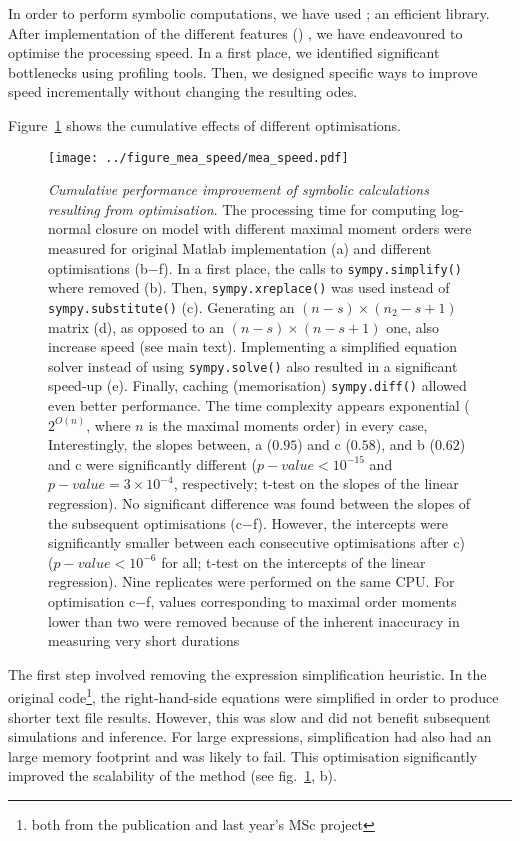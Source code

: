 In order to perform symbolic computations, we have used \sympy{} \cite{sympy_development_team_sympy:_2014}; an efficient \py{} library.
After implementation of the different features ()
, we have endeavoured to optimise the processing speed.
In a first place, we identified significant bottlenecks using \py{} profiling tools.
Then, we designed specific ways to improve speed incrementally without changing the resulting \gls{ode}s.

Figure~\ref{fig:mea_speed} shows the cumulative effects of different optimisations.


\begin{figure}

\texttt{[image: ../figure\_mea\_speed/mea\_speed.pdf]}
\caption{\emph{Cumulative performance improvement of symbolic calculations resulting from optimisation}.
The processing time for computing log-normal closure on \pft{} model with different maximal moment orders were measured for original Matlab implementation (a) and different optimisations (b$-$f).
In a first place, the calls to \texttt{sympy.simplify()} where removed (b). 
Then, \texttt{sympy.xreplace()} was used instead of \texttt{sympy.substitute()} (c). 
Generating an $(n-s) \times (n_2-s + 1)$ matrix (d), as opposed to an $(n-s) \times (n-s + 1)$ one, also increase speed (see main text).
Implementing a simplified equation solver instead of using \texttt{sympy.solve()} also resulted in a significant speed-up (e). Finally, caching (memorisation) \texttt{sympy.diff()} allowed even better performance.
The time complexity appears exponential ($2^{O(n)}$, where $n$ is the maximal moments order) in every case, 
Interestingly, the slopes between, a ($0.95$) and c ($0.58$), and b ($0.62$) and c were significantly different ($p-value <10^{-15}$ and $p-value = 3 \times 10^{-4}$, respectively; t-test on the slopes of the linear regression). 
No significant difference was found between the slopes of the subsequent optimisations (c$-$f). 
However, the intercepts were significantly smaller between each consecutive optimisations after c) ($p-value < 10^{-6}$ for all; t-test on the intercepts of the linear regression).
Nine replicates were performed on the same CPU. For optimisation c$-$f, values corresponding to maximal order moments lower than two were removed because of the inherent inaccuracy in measuring very short durations}
\label{fig:mea_speed}
\end{figure}


The first step involved removing the expression simplification heuristic.
In the original code\footnote{both from the publication and last year's MSc project}, the right-hand-side equations were simplified in order to produce shorter text file results.
However, this was slow and did not benefit subsequent simulations and inference.
For large expressions, simplification had also had an large memory footprint and was likely to fail.
This optimisation significantly improved the scalability of the method (see fig.~\ref{fig:mea_speed}, b).

